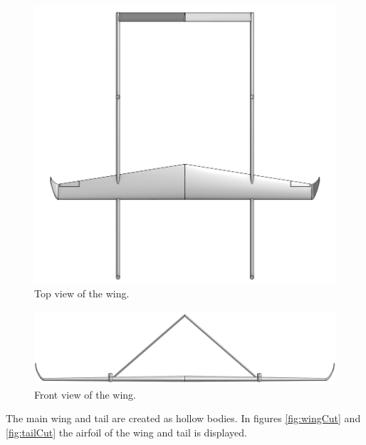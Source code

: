 \documentclass[english,fira]{ist-report}
\begin{document}
\begin{figure}[ht]
	\centering
	\includegraphics[width = 1\linewidth]{graphics/cad/wingTop.png}
	\caption{Top view of the wing.}
	\label{fig:wingTop}
\end{figure}

\begin{figure}[ht]
	\centering
	\includegraphics[width = 1\linewidth]{graphics/cad/wingFront.png}
	\caption{Front view of the wing.}
	\label{fig:wingFront}
\end{figure}

The main wing and tail are created as hollow bodies. In figures \ref{fig:wingCut} and \ref{fig:tailCut} the airfoil of the wing and tail is displayed.
\end{document}
